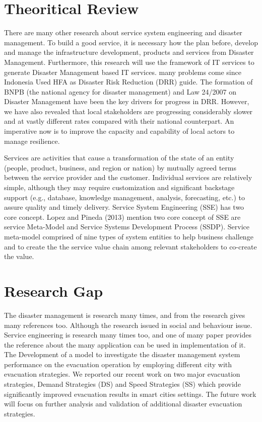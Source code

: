 \section{Theoritical Review}
There are many other research about  service system engineering and disaster management. To build a good service, it is necessary how the plan before, develop and manage the infrastructure development, products and services from Disaster Management. Furthermore, this research will use the framework of IT services to generate Disaster Management based IT services. many problems come since Indonesia Used HFA as Disaster Risk Reduction (DRR) guide. The formation of BNPB (the national agency for disaster management) and Law 24/2007 on Disaster Management have been the key drivers for progress in DRR. However, we have also revealed that local stakeholders are progressing considerably slower and at vastly different rates compared with their national counterpart. An imperative now is to improve the capacity and capability of local actors to manage resilience. \par  
Services are activities that cause a transformation of the state of an entity (people, product, business, and region or nation) by mutually agreed terms between the service provider and the customer. Individual services are relatively simple, although they may require customization and significant backstage support (e.g., database, knowledge management, analysis, forecasting, etc.) to assure quality and timely delivery. Service System Engineering (SSE) has two core concept. Lopez and Pineda (2013) mention two core concept of SSE are service Meta-Model and Service Systems Development Process (SSDP). Service meta-model comprised of nine types of system entities to help business challenge and to create the the service value chain among relevant stakeholders to co-create the value.\par


\section{Research Gap}
The disaster management is research many times, and from the research gives many references too. Although the research issued in social and behaviour issue. Service engineering is research many times too, and one of many paper provides the reference about the many application can be used in implementation of it. The Development of a model to investigate the disaster management system performance on the evacuation operation by employing different city with evacuation strategies. We reported our recent work on two major evacuation strategies, Demand Strategies (DS) and Speed Strategies (SS) which provide significantly improved evacuation results in smart cities settings. The future work will focus on further analysis and validation of additional disaster evacuation strategies.\par

